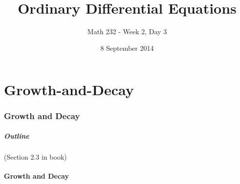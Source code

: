 \part{Growth-and-Decay}
\section{Growth and Decay}

\title{Ordinary Differential Equations}
\subtitle{Math 232 - Week 2, Day 3}
\date{8 September 2014}

\begin{frame}
  \titlepage
\end{frame}

\begin{frame}
  \frametitle{Outline}
  \tableofcontents[ currentsection ]

  (Section 2.3 in book)
\end{frame}


\subsection{Growth and Decay}



